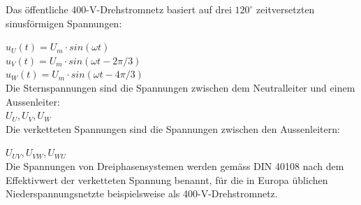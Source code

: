 \begin{minipage}{0.6 \linewidth}
Das öffentliche 400-V-Drehstromnetz basiert auf drei $120^\circ$ zeitversetzten sinusförmigen Spannungen: 

$u_U(t) = U_m \cdot sin(\omega t)$ \\

$u_V(t) = U_m \cdot sin(\omega t - 2\pi/3)$ \\

$u_W(t) = U_m \cdot sin(\omega t - 4\pi/3)$ \\

Die Sternspannungen sind die Spannungen zwischen dem Neutralleiter und einem Aussenleiter: \\

$U_U, U_V,U_W$ \\

Die verketteten Spannungen sind die Spannungen zwischen den Aussenleitern:

$U_{UV}, U_{VW},U_{WU}$ \\

Die Spannungen von Dreiphasensystemen werden gemäss DIN 40108 nach dem Effektivwert der verketteten Spannung benannt, für die in Europa üblichen Niederspannungsnetzte beispielsweise als 400-V-Drehstromnetz.
\end{minipage}

